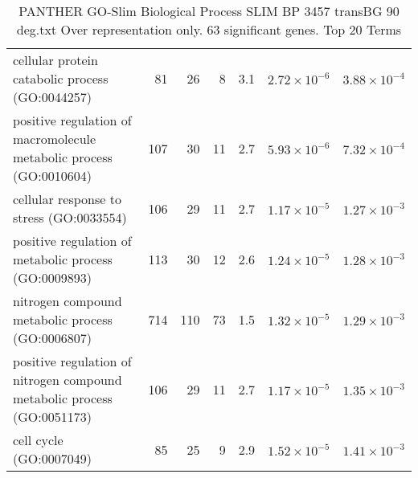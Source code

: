 \begin{table}[ht]
\begin{adjustbox}{width=\textwidth}
\begin{tabular}{lrrrrrr}
  cellular protein catabolic process (GO:0044257) & 81 & 26 & 8 & 3.1 & $2.72 \times 10^{-6}$ & $3.88 \times 10^{-4}$ \\ 
  positive regulation of macromolecule metabolic process (GO:0010604) & 107 & 30 & 11 & 2.7 & $5.93 \times 10^{-6}$ & $7.32 \times 10^{-4}$ \\ 
  cellular response to stress (GO:0033554) & 106 & 29 & 11 & 2.7 & $1.17 \times 10^{-5}$ & $1.27 \times 10^{-3}$ \\ 
  positive regulation of metabolic process (GO:0009893) & 113 & 30 & 12 & 2.6 & $1.24 \times 10^{-5}$ & $1.28 \times 10^{-3}$ \\ 
  nitrogen compound metabolic process (GO:0006807) & 714 & 110 & 73 & 1.5 & $1.32 \times 10^{-5}$ & $1.29 \times 10^{-3}$ \\ 
  positive regulation of nitrogen compound metabolic process (GO:0051173) & 106 & 29 & 11 & 2.7 & $1.17 \times 10^{-5}$ & $1.35 \times 10^{-3}$ \\ 
  cell cycle (GO:0007049) & 85 & 25 & 9 & 2.9 & $1.52 \times 10^{-5}$ & $1.41 \times 10^{-3}$ \\ 
   \hline
\end{tabular}
\end{adjustbox}
\caption{PANTHER GO-Slim Biological Process SLIM BP 3457 transBG 90 deg.txt Over representation only. 63 significant genes. Top 20 Terms} 
\label{tab:PANTHER GO-Slim Biological Process SLIM BP 3457 transBG 90 deg.txt Over representation only. 63 significant genes. Top 20 Terms}
\end{table}





